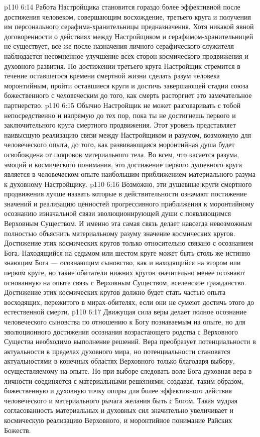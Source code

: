 \vs p110 6:14 \pc {} Работа Настройщика становится гораздо более эффективной после достижения человеком, совершающим восхождение, третьего круга и получения им персонального серафима\hyp{}хранительницы предназначения. Хотя никакой явной договоренности о действиях между Настройщиком и серафимом\hyp{}хранительницей не существует, все же после назначения личного серафического служителя наблюдается несомненное улучшение всех сторон космического продвижения и духовного развития. По достижении третьего круга Настройщик стремится в течение оставшегося времени смертной жизни сделать разум человека моронтийным, пройти оставшиеся круги и достичь завершающей стадии союза божественного с человеческим до того, как смерть расторгнет это замечательное партнерство.
\vs p110 6:15 \pc {} Обычно Настройщик не может разговаривать с тобой непосредственно и напрямую до тех пор, пока ты не достигнешь первого и заключительного круга смертного продвижения. Этот уровень представляет наивысшую реализацию связи между Настройщиком и разумом, возможную для человеческого опыта, до того, как развивающаяся моронтийная душа будет освобождена от покровов материального тела. Во всем, что касается разума, эмоций и космического понимания, это достижение первого душевного круга является в человеческом опыте наибольшим приближением материального разума к духовному Настройщику.
\vs p110 6:16 \pc Возможно, эти душевные круги смертного продвижения лучше назвать  которые в действительности означают постижение значений и реализацию ценностей прогрессивного приближения к моронтийному осознанию изначальной связи эволюционирующей души с появляющимся Верховным Существом. И именно эта самая связь делает навсегда невозможным полностью объяснить материальному разуму значение космических кругов. Достижение этих космических кругов только относительно связано с осознанием Бога. Находящийся на седьмом или шестом круге может быть столь же истинно знающим Бога --- осознающим сыновство, как и находящийся на втором или первом круге, но такие обитатели нижних кругов значительно менее осознают основанную на опыте связь с Верховным Существом, вселенское гражданство. Достижение этих космических кругов должно будет стать частью опыта восходящих, пережитого в мирах\hyp{}обителях, если они не сумеют достичь этого до естественной смерти.
\vs p110 6:17 Движущая сила веры делает полное осознание человеческого сыновства по отношению к Богу познаваемым на опыте, но для эволюционного достижения осознания возрастающего родства с  Верховного Существа необходимо  выполнение решений. Вера преобразует потенциальности в актуальности в пределах духовного мира, но потенциальности становятся актуальностями в конечных областях Верховного только благодаря выбору, осуществляемому на опыте. Но при выборе следовать воле Бога духовная вера в личности соединяется с материальными решениями, создавая, таким образом, божественную и духовную точку опоры для более эффективного действия человеческого и материального рычага желания быть с Богом. Такая мудрая согласованность материальных и духовных сил значительно увеличивает и космическую реализацию Верховного, и моронтийное понимание Райских Божеств.
